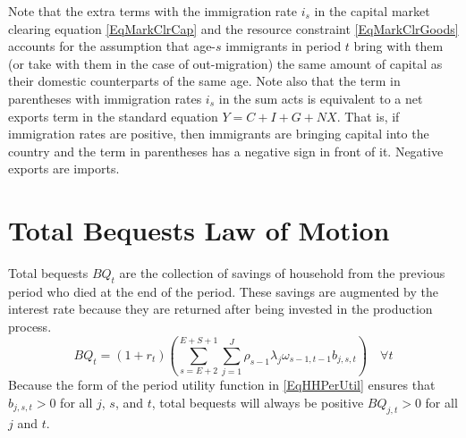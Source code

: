   Note that the extra terms with the immigration rate $i_s$ in the capital market clearing equation \eqref{EqMarkClrCap} and the resource constraint \eqref{EqMarkClrGoods} accounts for the assumption that age-$s$ immigrants in period $t$ bring with them (or take with them in the case of out-migration) the same amount of capital as their domestic counterparts of the same age. Note also that the term in parentheses with immigration rates $i_s$ in the sum acts is equivalent to a net exports term in the standard equation $Y=C+I+G+NX$. That is, if immigration rates are positive, then immigrants are bringing capital into the country and the term in parentheses has a negative sign in front of it. Negative exports are imports.


\section{Total Bequests Law of Motion}\label{SecMarkClrBQ}

  Total bequests $BQ_t$ are the collection of savings of household from the previous period who died at the end of the period. These savings are augmented by the interest rate because they are returned after being invested in the production process.
  \begin{equation}\label{EqMarkClrBQ}
    BQ_{t} = (1+r_{t})\left(\sum_{s=E+2}^{E+S+1}\sum_{j=1}^J\rho_{s-1}\lambda_j\omega_{s-1,t-1}b_{j,s,t}\right) \quad\forall t
  \end{equation}
  Because the form of the period utility function in \eqref{EqHHPerUtil} ensures that $b_{j,s,t}>0$ for all $j$, $s$, and $t$, total bequests will always be positive $BQ_{j,t}>0$ for all $j$ and $t$.
